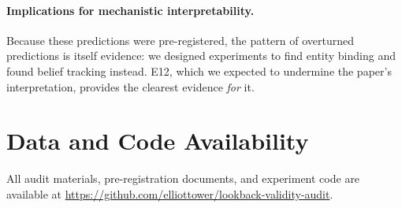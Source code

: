 \documentclass{article}
\begin{document}
\paragraph{Implications for mechanistic interpretability.}
Because these predictions were pre-registered, the pattern of overturned predictions is itself evidence: we designed experiments to find entity binding and found belief tracking instead. E12, which we expected to undermine the paper's interpretation, provides the clearest evidence \emph{for} it.


\section*{Data and Code Availability}

All audit materials, pre-registration documents, and experiment code are available at \url{https://github.com/elliottower/lookback-validity-audit}.



\end{document}

